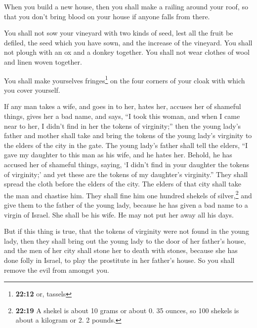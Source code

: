  When you build a new house, then you shall make a railing
around your roof, so that you don't bring blood on your house if anyone
falls from there.

 You shall not sow your vineyard with two kinds of seed,
lest all the fruit be defiled, the seed which you have sown, and the
increase of the vineyard.  You shall not plough with an
ox and a donkey together.  You shall not wear clothes of
wool and linen woven together.

 You shall make yourselves fringes\footnote{\textbf{22:12}
  or, tassels} on the four corners of your cloak with which you cover
yourself.

 If any man takes a wife, and goes in to her, hates her,
 accuses her of shameful things, gives her a bad name,
and says, ``I took this woman, and when I came near to her, I didn't
find in her the tokens of virginity;''  then the young
lady's father and mother shall take and bring the tokens of the young
lady's virginity to the elders of the city in the gate. 
The young lady's father shall tell the elders, ``I gave my daughter to
this man as his wife, and he hates her.  Behold, he has
accused her of shameful things, saying, `I didn't find in your daughter
the tokens of virginity;' and yet these are the tokens of my daughter's
virginity.'' They shall spread the cloth before the elders of the city.
 The elders of that city shall take the man and chastise
him.  They shall fine him one hundred shekels of
silver,\footnote{\textbf{22:19} A shekel is about 10 grams or about 0.
  35 ounces, so 100 shekels is about a kilogram or 2. 2 pounds.} and
give them to the father of the young lady, because he has given a bad
name to a virgin of Israel. She shall be his wife. He may not put her
away all his days.

 But if this thing is true, that the tokens of virginity
were not found in the young lady,  then they shall bring
out the young lady to the door of her father's house, and the men of her
city shall stone her to death with stones, because she has done folly in
Israel, to play the prostitute in her father's house. So you shall
remove the evil from amongst you.

